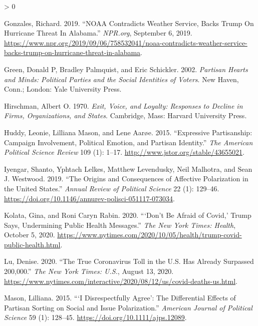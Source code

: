 \documentclass[
  12pt,
]{article}
\newlength{\cslhangindent}
\newenvironment{CSLReferences}[2] %
 {%
  \setlength{\parindent}{0pt}
  \ifodd #1 \everypar{\setlength{\hangindent}{\cslhangindent}}\ignorespaces\fi
  \ifnum #2 > 0
  \setlength{\parskip}{#2\baselineskip}
  \fi
 }%
 {}
\begin{document}
\begin{CSLReferences}{1}{0}
\leavevmode\hypertarget{ref-Gonzales2019}{}%
Gonzales, Richard. 2019. {``{NOAA Contradicts Weather Service}, {Backs Trump On Hurricane Threat In Alabama}.''} \emph{NPR.org}, September 6, 2019. \url{https://www.npr.org/2019/09/06/758532041/noaa-contradicts-weather-service-backs-trump-on-hurricane-threat-in-alabama}.

\leavevmode\hypertarget{ref-Green2002}{}%
Green, Donald P, Bradley Palmquist, and Eric Schickler. 2002. \emph{Partisan Hearts and Minds: Political Parties and the Social Identities of Voters}. {New Haven, Conn.; London}: {Yale University Press}.

\leavevmode\hypertarget{ref-Hirschman1970a}{}%
Hirschman, Albert O. 1970. \emph{Exit, Voice, and Loyalty: Responses to Decline in Firms, Organizations, and States}. {Cambridge, Mass}: {Harvard University Press}.

\leavevmode\hypertarget{ref-Huddy2015}{}%
Huddy, Leonie, Lilliana Mason, and Lene Aarøe. 2015. {``Expressive {Partisanship}: {Campaign Involvement}, {Political Emotion}, and {Partisan Identity}.''} \emph{The American Political Science Review} 109 (1): 1--17. \url{http://www.jstor.org/stable/43655021}.

\leavevmode\hypertarget{ref-Iyengar2019}{}%
Iyengar, Shanto, Yphtach Lelkes, Matthew Levendusky, Neil Malhotra, and Sean J. Westwood. 2019. {``The {Origins} and {Consequences} of {Affective Polarization} in the {United States}.''} \emph{Annual Review of Political Science} 22 (1): 129--46. \url{https://doi.org/10.1146/annurev-polisci-051117-073034}.

\leavevmode\hypertarget{ref-Kolata2020}{}%
Kolata, Gina, and Roni Caryn Rabin. 2020. {``{`{Don}'t {Be Afraid} of {Covid},'} {Trump Says}, {Undermining Public Health Messages}.''} \emph{The New York Times: Health}, October 5, 2020. \url{https://www.nytimes.com/2020/10/05/health/trump-covid-public-health.html}.

\leavevmode\hypertarget{ref-Lu2020}{}%
Lu, Denise. 2020. {``The {True Coronavirus Toll} in the {U}.{S}. {Has Already Surpassed} 200,000.''} \emph{The New York Times: U.S.}, August 13, 2020. \url{https://www.nytimes.com/interactive/2020/08/12/us/covid-deaths-us.html}.

\leavevmode\hypertarget{ref-Mason2015}{}%
Mason, Lilliana. 2015. {``{`{I Disrespectfully Agree}'}: {The Differential Effects} of {Partisan Sorting} on {Social} and {Issue Polarization}.''} \emph{American Journal of Political Science} 59 (1): 128--45. \url{https://doi.org/10.1111/ajps.12089}.


\end{CSLReferences}
\end{document}
